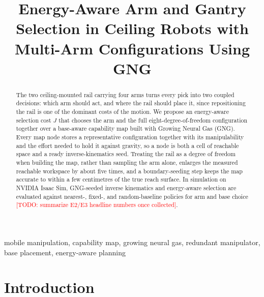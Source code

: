 \documentclass[conference]{IEEEtran}
\newcommand{\TODO}[1]{\textcolor{red}{[TODO: #1]}}
\begin{document}
\title{Energy-Aware Arm and Gantry Selection in Ceiling Robots with Multi-Arm Configurations Using GNG}

\author{
\IEEEauthorblockN{1\textsuperscript{st} \TODO{Given Name Surname}}
\IEEEauthorblockA{\textit{\TODO{dept. name of organization}} \\
\textit{\TODO{name of organization}}\\
\TODO{City, Country} \\
\TODO{email address or ORCID}}
}

\maketitle

\begin{abstract}
The two ceiling-mounted rail carrying four arms turns every pick into two coupled decisions:
which arm should act, and where the rail should place it, since repositioning the
rail is one of the dominant costs of the motion. We propose an energy-aware
selection cost $J$ that chooses the arm and the full eight-degree-of-freedom
configuration together over a base-aware capability map built with Growing Neural
Gas (GNG). Every map node stores a representative configuration together with its
manipulability and the effort needed to hold it against gravity, so a node is both a
cell of reachable space and a ready inverse-kinematics seed. Treating the rail as a
degree of freedom when building the map, rather than sampling the arm alone, enlarges
the measured reachable workspace by about five times, and a boundary-seeding step
keeps the map accurate to within a few centimetres of the true reach surface. In
simulation on NVIDIA Isaac Sim, GNG-seeded inverse kinematics and energy-aware
selection are evaluated against nearest-, fixed-, and random-baseline policies for
arm and base choice \TODO{summarize E2/E3 headline numbers once collected}.
\end{abstract}

\begin{IEEEkeywords}
mobile manipulation, capability map, growing neural gas, redundant manipulator,
base placement, energy-aware planning
\end{IEEEkeywords}

\section{Introduction}
\end{document}
